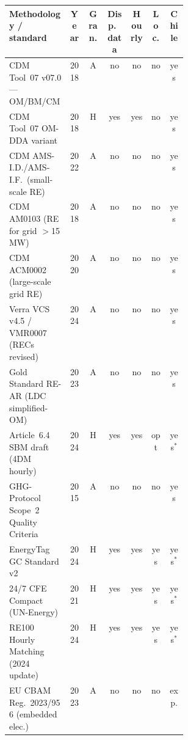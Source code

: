 \setlength{\tabcolsep}{4pt}
\renewcommand{\arraystretch}{1.05}
\footnotesize
\begin{tabular}{@{}p{0.34\linewidth}cccccc@{}}
\toprule
Methodology / standard & Year &
  Gran. & Disp.\ data & Hourly & Loc.\ & Chile \\
\midrule
CDM Tool~07 v07.0 — OM/BM/CM             & 2018 & A & no  & no  & no  & yes\\
CDM Tool~07 OM-DDA variant               & 2018 & H & yes & yes & no  & yes\\
CDM AMS-I.D./AMS-I.F.\ (small-scale RE)  & 2022 & A & no  & no  & no  & yes\\
CDM AM0103 (RE for grid $>$15 MW)        & 2018 & A & no  & no  & no  & yes\\
CDM ACM0002 (large-scale grid RE)        & 2020 & A & no  & no  & no  & yes\\
Verra VCS v4.5 / VMR0007 (RECs revised)  & 2024 & A & no  & no  & no  & yes\\
Gold Standard RE-AR (LDC simplified-OM)  & 2023 & A & no  & no  & no  & yes\\
Article~6.4 SBM draft (4DM hourly)       & 2024 & H & yes & yes & opt & yes$^\ast$\\
GHG-Protocol Scope~2 Quality Criteria    & 2015 & A & no  & no  & no  & yes\\
EnergyTag GC Standard v2                 & 2024 & H & yes & yes & yes & yes$^\ast$\\
24/7 CFE Compact (UN-Energy)             & 2021 & H & yes & yes & yes & yes$^\ast$\\
RE100 Hourly Matching (2024 update)      & 2024 & H & yes & yes & yes & yes$^\ast$\\
EU CBAM Reg.\ 2023/956 (embedded elec.)  & 2023 & A & no  & no  & no  & exp.\\
\bottomrule
\end{tabular}

